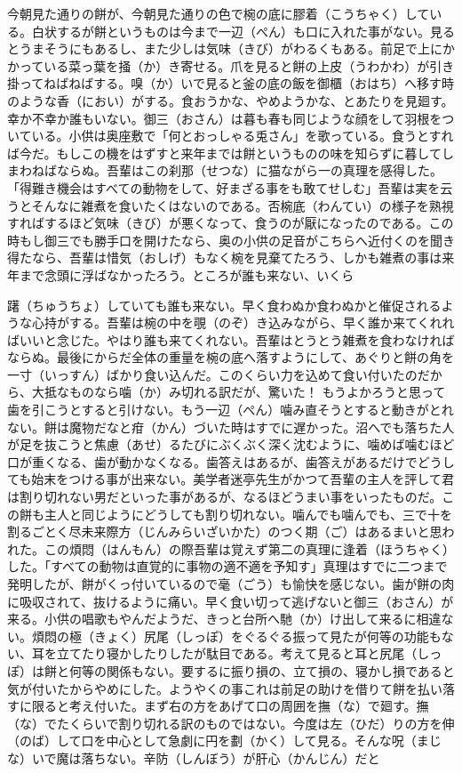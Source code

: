 \documentclass{book}
\begin{document}
今朝見た通りの餅が、今朝見た通りの色で椀の底に膠着（こうちゃく）している。白状するが餅というものは今まで一辺（ぺん）も口に入れた事がない。見るとうまそうにもあるし、また少しは気味（きび）がわるくもある。前足で上にかかっている菜っ葉を掻（か）き寄せる。爪を見ると餅の上皮（うわかわ）が引き掛ってねばねばする。嗅（か）いで見ると釜の底の飯を御櫃（おはち）へ移す時のような香（におい）がする。食おうかな、やめようかな、とあたりを見廻す。幸か不幸か誰もいない。御三（おさん）は暮も春も同じような顔をして羽根をついている。小供は奥座敷で「何とおっしゃる兎さん」を歌っている。食うとすれば今だ。もしこの機をはずすと来年までは餅というものの味を知らずに暮してしまわねばならぬ。吾輩はこの刹那（せつな）に猫ながら一の真理を感得した。「得難き機会はすべての動物をして、好まざる事をも敢てせしむ」吾輩は実を云うとそんなに雑煮を食いたくはないのである。否椀底（わんてい）の様子を熟視すればするほど気味（きび）が悪くなって、食うのが厭になったのである。この時もし御三でも勝手口を開けたなら、奥の小供の足音がこちらへ近付くのを聞き得たなら、吾輩は惜気（おしげ）もなく椀を見棄てたろう、しかも雑煮の事は来年まで念頭に浮ばなかったろう。ところが誰も来ない、いくら\begin{comment}\texttt{[image: ../../../gaiji/1-92/1-92-39.png]}\end{comment}躇（ちゅうちょ）していても誰も来ない。早く食わぬか食わぬかと催促されるような心持がする。吾輩は椀の中を覗（のぞ）き込みながら、早く誰か来てくれればいいと念じた。やはり誰も来てくれない。吾輩はとうとう雑煮を食わなければならぬ。最後にからだ全体の重量を椀の底へ落すようにして、あぐりと餅の角を一寸（いっすん）ばかり食い込んだ。このくらい力を込めて食い付いたのだから、大抵なものなら噛（か）み切れる訳だが、驚いた！ もうよかろうと思って歯を引こうとすると引けない。もう一辺（ぺん）噛み直そうとすると動きがとれない。餅は魔物だなと疳（かん）づいた時はすでに遅かった。沼へでも落ちた人が足を抜こうと焦慮（あせ）るたびにぶくぶく深く沈むように、噛めば噛むほど口が重くなる、歯が動かなくなる。歯答えはあるが、歯答えがあるだけでどうしても始末をつける事が出来ない。美学者迷亭先生がかつて吾輩の主人を評して君は割り切れない男だといった事があるが、なるほどうまい事をいったものだ。この餅も主人と同じようにどうしても割り切れない。噛んでも噛んでも、三で十を割るごとく尽未来際方（じんみらいざいかた）のつく期（ご）はあるまいと思われた。この煩悶（はんもん）の際吾輩は覚えず第二の真理に逢着（ほうちゃく）した。「すべての動物は直覚的に事物の適不適を予知す」真理はすでに二つまで発明したが、餅がくっ付いているので毫（ごう）も愉快を感じない。歯が餅の肉に吸収されて、抜けるように痛い。早く食い切って逃げないと御三（おさん）が来る。小供の唱歌もやんだようだ、きっと台所へ馳（か）け出して来るに相違ない。煩悶の極（きょく）尻尾（しっぽ）をぐるぐる振って見たが何等の功能もない、耳を立てたり寝かしたりしたが駄目である。考えて見ると耳と尻尾（しっぽ）は餅と何等の関係もない。要するに振り損の、立て損の、寝かし損であると気が付いたからやめにした。ようやくの事これは前足の助けを借りて餅を払い落すに限ると考え付いた。まず右の方をあげて口の周囲を撫（な）で廻す。撫（な）でたくらいで割り切れる訳のものではない。今度は左（ひだ）りの方を伸（のば）して口を中心として急劇に円を劃（かく）して見る。そんな呪（まじな）いで魔は落ちない。辛防（しんぼう）が肝心（かんじん）だと
\end{document}
